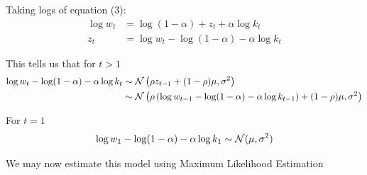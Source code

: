 \documentclass[12pt, letterpaper]{paper}
\begin{document}
Taking logs of equation (3):
\begin{align*}
  \log w_t &= \log ( 1- \alpha) + z_t + \alpha \log k_t\\
  z_t &= \log w_t - \log ( 1- \alpha) - \alpha \log k_t
\end{align*}

This tells us that for $t > 1$
\begin{align*}
  \log w_t - \log ( 1- \alpha) - \alpha \log k_t &\sim \mathcal{N}\left( \rho z_{t-1} +
                                             (1-\rho)\mu, \sigma^2 \right)\\
  &\sim \mathcal{N}\left( \rho\left( \log w_{t-1} - \log( 1- \alpha) - \alpha \log
    k_{t-1} \right) + (1-\rho)\mu, \sigma^2 \right)
\end{align*}

For $t=1$
\begin{equation*}
  \log w_1 - \log ( 1- \alpha) - \alpha \log k_1 \sim \mathcal{N}( \mu, \sigma^2)
\end{equation*}


We may now estimate this model using Maximum Likelihood Estimation
\end{document}
